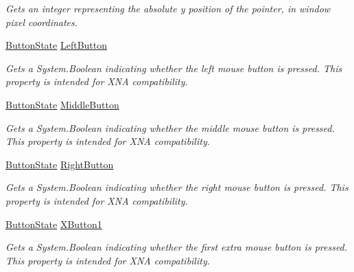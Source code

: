 \begin{DoxyCompactItemize}
\begin{DoxyCompactList}\small\item\em Gets an integer representing the absolute y position of the pointer, in window pixel coordinates. \end{DoxyCompactList}\item 
\hyperlink{namespace_open_t_k_1_1_input_a115b5677e3f8372e1c952fedc964d161}{Button\-State} \hyperlink{struct_open_t_k_1_1_input_1_1_mouse_state_a025319a078dfbe9eb67ad930db990869}{Left\-Button}
\begin{DoxyCompactList}\small\item\em Gets a System.\-Boolean indicating whether the left mouse button is pressed. This property is intended for X\-N\-A compatibility. \end{DoxyCompactList}\item 
\hyperlink{namespace_open_t_k_1_1_input_a115b5677e3f8372e1c952fedc964d161}{Button\-State} \hyperlink{struct_open_t_k_1_1_input_1_1_mouse_state_a39c01ea816a799c76cb3fe572e72fb97}{Middle\-Button}
\begin{DoxyCompactList}\small\item\em Gets a System.\-Boolean indicating whether the middle mouse button is pressed. This property is intended for X\-N\-A compatibility. \end{DoxyCompactList}\item 
\hyperlink{namespace_open_t_k_1_1_input_a115b5677e3f8372e1c952fedc964d161}{Button\-State} \hyperlink{struct_open_t_k_1_1_input_1_1_mouse_state_a8b9002f3148672b78e890e99e6d8d7b7}{Right\-Button}
\begin{DoxyCompactList}\small\item\em Gets a System.\-Boolean indicating whether the right mouse button is pressed. This property is intended for X\-N\-A compatibility. \end{DoxyCompactList}\item 
\hyperlink{namespace_open_t_k_1_1_input_a115b5677e3f8372e1c952fedc964d161}{Button\-State} \hyperlink{struct_open_t_k_1_1_input_1_1_mouse_state_a693612a1acde7d368593396db3f38d37}{X\-Button1}
\begin{DoxyCompactList}\small\item\em Gets a System.\-Boolean indicating whether the first extra mouse button is pressed. This property is intended for X\-N\-A compatibility. \end{DoxyCompactList}\item 

\end{DoxyCompactItemize}
